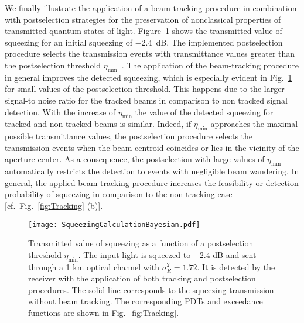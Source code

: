 \documentclass[aps,pra,twocolumn,a4paper,nofootinbib,preprintnumbers] {revtex4-1}
\begin{document}
      We finally illustrate the application of a beam-tracking procedure in combination with postselection strategies for the preservation of nonclassical properties of transmitted quantum states of light.
      Figure~\ref{fig:Squeezing} shows the transmitted value of squeezing for an initial squeezing of $-2.4$~dB.
      The implemented postselection procedure selects the transmission events with transmittance values greater than the postselection threshold $\eta_{\mathrm{min}}$~\cite{Peuntinger, Vasylyev2016}.
      The application of the beam-tracking  procedure in general improves the detected squeezing, which is especially evident in Fig.~\ref{fig:Squeezing} for small values of the postselection threshold.
      This happens due to the larger signal-to noise ratio for the tracked beams in comparison to  non tracked signal detection.
      With the increase of $\eta_{\mathrm{min}}$ the value of the detected squeezing for tracked and non tracked beams is similar.
      Indeed, if $\eta_{\mathrm{min}}$ approaches the maximal possible transmittance values, the postselection procedure selects the transmission events when the beam centroid coincides or lies in the vicinity of the aperture center.
      As a consequence, the postselection with large values of $\eta_{\mathrm{min}}$ automatically restricts the detection to events with negligible beam wandering.
      In general, the applied beam-tracking procedure increases the feasibility or detection probability of squeezing in comparison to the non tracking case [cf.~Fig.~\ref{fig:Tracking} (b)].





\begin{figure}[ht]
 \texttt{[image: SqueezingCalculationBayesian.pdf]}
 \caption{\label{fig:Squeezing}
Transmitted value of squeezing as a function of a postselection threshold $\eta_{\mathrm{min}}$.
The input light is  squeezed to $-2.4$ dB  and sent through a 1 km optical channel with $\sigma_R^2=1.72$.
It is detected by the receiver with the  application of both tracking and postselection procedures.
The solid line corresponds to the squeezing transmission without  beam tracking.
The corresponding PDTs and exceedance functions are shown in Fig.~\ref{fig:Tracking}.
}
\end{figure}



\end{document}

